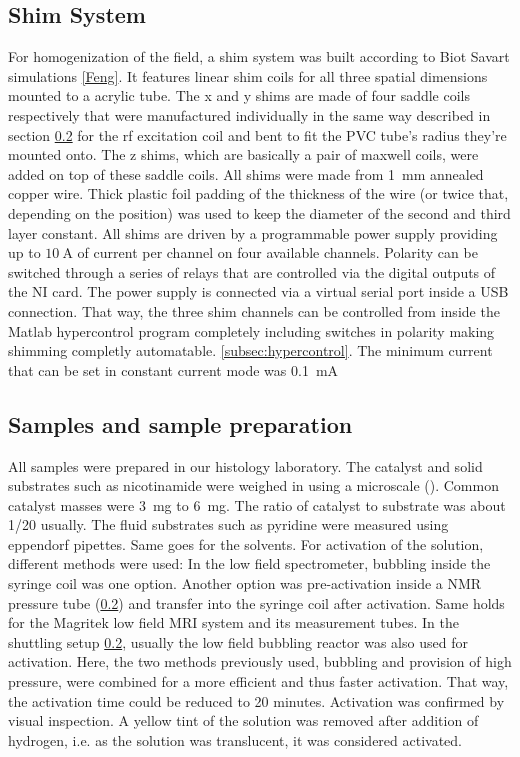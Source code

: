         \subsection{Shim System}
        For homogenization of the field, a shim system was built according to Biot Savart simulations \ref{Feng}. It features linear shim coils for all three spatial dimensions mounted to a  acrylic tube. The x and y shims are made of four saddle coils respectively that were manufactured individually in the same way described in section \ref{} for the rf excitation coil and bent to fit the PVC tube's radius they're mounted onto. The z shims, which are basically a pair of maxwell coils, were added on top of these saddle coils. All shims were made from \SI{1}{\mm} annealed copper wire. Thick plastic foil padding of the thickness of the wire (or twice that, depending on the position) was used to keep the diameter of the second and third layer constant. All shims are driven by a  programmable power supply providing up to $\SI{10}{\ampere}$ of current per channel on four available channels. Polarity can be switched through a series of relays that are controlled via the digital outputs of the NI card. The power supply is connected via a virtual serial port inside a USB connection. That way, the three shim channels can be controlled from inside the Matlab hypercontrol program completely including switches in polarity making shimming completly automatable. \ref{subsec:hypercontrol}.
        The minimum current that can be set in constant current mode was \SI{0.1}{\milli\ampere}
        \subsection{Samples and sample preparation}
        All samples were prepared in our histology laboratory. The catalyst and solid substrates such as nicotinamide were weighed in using a microscale (). Common catalyst masses were \SI{3}{\milli\gram} to \SI{6}{\milli\gram}. The ratio of catalyst to substrate was about \SI{1/20}{} usually. The fluid substrates such as pyridine were measured using eppendorf pipettes. Same goes for the solvents.
        For activation of the solution, different methods were used: In the low field spectrometer, bubbling inside the syringe coil was one option. Another option was pre-activation inside a NMR pressure tube (\ref{}) and transfer into the syringe coil after activation. Same holds for the Magritek low field MRI system and its measurement tubes.
        In the shuttling setup \ref{}, usually the low field bubbling reactor was also used for activation. Here, the two methods previously used, bubbling and provision of high pressure, were combined for a more efficient and thus faster activation. That way, the activation time could be reduced to 20 minutes.
        Activation was confirmed by visual inspection. A yellow tint of the solution was removed after addition of hydrogen, i.e. as the solution was translucent, it was considered activated.

